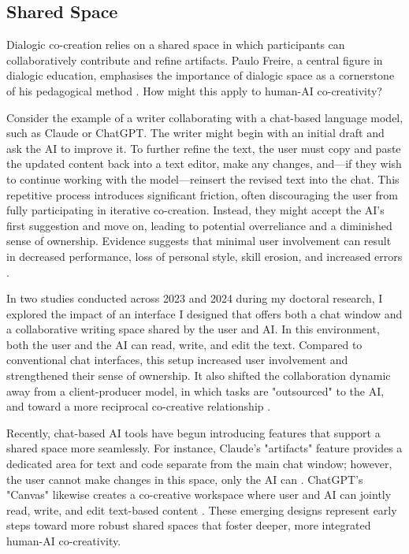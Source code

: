 \subsection{Shared Space}

Dialogic co-creation relies on a shared space in which participants can collaboratively contribute and refine artifacts. Paulo Freire, a central figure in dialogic education, emphasises the importance of dialogic space as a cornerstone of his pedagogical method \cite{Freire1970-pa}. How might this apply to human-AI co-creativity?

Consider the example of a writer collaborating with a chat-based language model, such as Claude or ChatGPT. The writer might begin with an initial draft and ask the AI to improve it. To further refine the text, the user must copy and paste the updated content back into a text editor, make any changes, and—if they wish to continue working with the model—reinsert the revised text into the chat. This repetitive process introduces significant friction, often discouraging the user from fully participating in iterative co-creation. Instead, they might accept the AI's first suggestion and move on, leading to potential overreliance and a diminished sense of ownership. Evidence suggests that minimal user involvement can result in decreased performance, loss of personal style, skill erosion, and increased errors \cite{Abbas2024-sf, Rafner2021-tm}.

In two studies conducted across 2023 and 2024 during my doctoral research, I explored the impact of an interface I designed that offers both a chat window and a collaborative writing space shared by the user and AI. In this environment, both the user and the AI can read, write, and edit the text. Compared to conventional chat interfaces, this setup increased user involvement and strengthened their sense of ownership. It also shifted the collaboration dynamic away from a client-producer model, in which tasks are "outsourced" to the AI, and toward a more reciprocal co-creative relationship \cite{Ocampo2024-dv}.

Recently, chat-based AI tools have begun introducing features that support a shared space more seamlessly. For instance, Claude's "artifacts" feature provides a dedicated area for text and code separate from the main chat window; however, the user cannot make changes in this space, only the AI can \cite{Whitney2024-pp, Anthropic2024-dl}. ChatGPT's "Canvas" likewise creates a co-creative workspace where user and AI can jointly read, write, and edit text-based content \cite{OpenAI2024-ug}. These emerging designs represent early steps toward more robust shared spaces that foster deeper, more integrated human-AI co-creativity.

